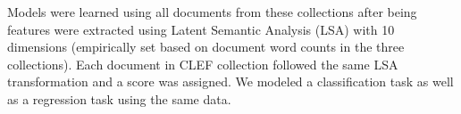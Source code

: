 Models were learned using all documents from these collections after being features were extracted using Latent Semantic Analysis (LSA) with 10 dimensions (empirically set based on document word counts in the three collections). Each document in CLEF collection followed the same LSA transformation and a score was assigned. We modeled a classification task as well as a regression task using the same data.





